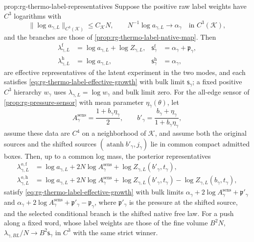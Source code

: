 {prop:rg-thermo-label-representatives}
Suppose the positive raw label weights have $C^3$ logarithms with
\begin{equation}
 \|\log a_{\gamma,L}\|_{C^3(\mathcal K)}\leq C_{\mathcal K}N,
 \qquad N^{-1}\log a_{\gamma,L}\longrightarrow\alpha_\gamma
                  \quad\text{in }C^3(\mathcal K),
 \label{eq:rg-thermo-label-raw-growth}
\end{equation}
and the branches are those of \cref{prop:rg-thermo-label-native-map}. Then
\begin{align}
 \lambda_{\gamma,L}^{\mathrm f}
 &=\log a_{\gamma,L}+\log Z_{\gamma,L},
 &\mathsf s_\gamma^{\mathrm f}&=\alpha_\gamma+\mathfrak p_\gamma,\label{eq:rg-thermo-label-factor-growth}\\
 \lambda_{\gamma,L}^{\mathrm h}
 &=\log a_{\gamma,L},
 &\mathsf s_\gamma^{\mathrm h}&=\alpha_\gamma,\label{eq:rg-thermo-label-hierarchy-growth}
\end{align}
are effective representatives of the latent experiment in the two modes, and
each satisfies \cref{eq:rg-thermo-label-effective-growth} with bulk limit
$\mathsf s_\gamma$; a fixed positive $C^3$ hierarchy $w_\gamma$ uses
$\lambda_{\gamma,L}=\log w_\gamma$ and bulk limit zero. For the all-edge
sensor of \cref{prop:rg-pressure-sensor} with mean parameter
$\eta_\gamma(\theta)$, let
\begin{equation}
 A_\gamma^{\mathrm{sens}}=\frac{1+b_\gamma\eta_\gamma}{2},\qquad
 b'_\gamma=\frac{b_\gamma+\eta_\gamma}{1+b_\gamma\eta_\gamma},
 \label{eq:rg-thermo-label-sensor-data}
\end{equation}
assume these data are $C^4$ on a neighborhood of $\mathcal K$, and assume
both the original sources and the shifted sources
$(\operatorname{atanh}b'_\gamma,j_\gamma)$ lie in common compact admitted
boxes. Then, up to a common log mass, the posterior representatives
\begin{align}
 \lambda_{\gamma,L}^{o,\mathrm f}
 &=\log a_{\gamma,L}+2N\log A_\gamma^{\mathrm{sens}}
                 +\log Z_{\gamma,L}(b'_\gamma,t_\gamma),
 \label{eq:rg-thermo-label-posterior-factor}\\
 \lambda_{\gamma,L}^{o,\mathrm h}
 &=\log a_{\gamma,L}+2N\log A_\gamma^{\mathrm{sens}}
       +\log Z_{\gamma,L}(b'_\gamma,t_\gamma)
       -\log Z_{\gamma,L}(b_\gamma,t_\gamma),
 \label{eq:rg-thermo-label-posterior-hierarchy}
\end{align}
satisfy \cref{eq:rg-thermo-label-effective-growth} with bulk limits
$\alpha_\gamma+2\log A_\gamma^{\mathrm{sens}}+\mathfrak p'_\gamma$ and
$\alpha_\gamma+2\log A_\gamma^{\mathrm{sens}}+\mathfrak p'_\gamma-\mathfrak p_\gamma$,
where $\mathfrak p'_\gamma$ is the pressure at the shifted source, and the
selected conditional branch is the shifted native free law. For a push along
a fixed word, whose label weights are those of the fine volume $B^2N$,
$\lambda_{\gamma,BL}/N\to B^2\mathsf s_\gamma$ in $C^3$ with the same strict
winner. 

